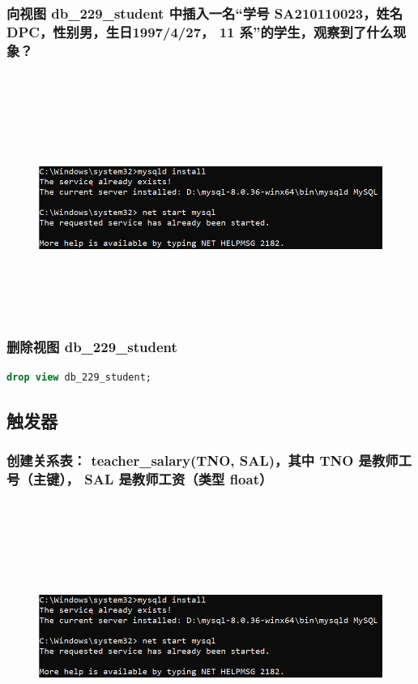 \documentclass{ctexart}
\begin{document}
\subsubsection{向视图 db\_229\_student 中插入一名“学号 SA210110023，姓名 DPC，性别男，生日1997/4/27， 11 系”的学生，观察到了什么现象？}
\begin{lstlisting}[language=sql]
	
\end{lstlisting}
\begin{figure}[H]
	\centering 
	\includegraphics[height=7cm,width=14cm]{1.png}
	\end{figure}
\subsubsection{删除视图 db\_229\_student}
\begin{lstlisting}[language=sql]
	drop view db_229_student;
\end{lstlisting}
\subsection{触发器}
\subsubsection{创建关系表： teacher\_salary(TNO, SAL)，其中 TNO 是教师工号（主键）， SAL 是教师工资（类型 float）}
\begin{lstlisting}[language=sql]
	
\end{lstlisting}
\begin{figure}[H]
	\centering 
	\includegraphics[height=7cm,width=14cm]{1.png}
	\end{figure}
\end{document}
